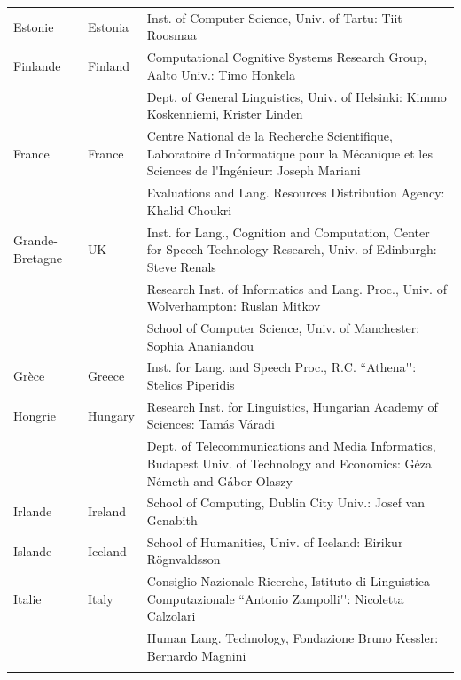 \begin{longtable}{llp{105mm}}
  Estonie & \textcolor{grey1}{Estonia} & Inst. of Computer Science, Univ. of Tartu: Tiit Roosmaa\\ \addlinespace

  Finlande & \textcolor{grey1}{Finland} & Computational Cognitive Systems Research Group, Aalto Univ.: Timo Honkela\\ \addlinespace
  & & Dept. of General Linguistics, Univ. of Helsinki: Kimmo Koskenniemi, Krister Linden \\ \addlinespace
 
 France & \textcolor{grey1}{France} & Centre National de la Recherche Scientifique, Laboratoire d{\mbox '}Informatique pour la Mécanique et les Sciences de l{\mbox '}Ingénieur: Joseph Mariani \\ \addlinespace
  & & Evaluations and Lang. Resources Distribution Agency: Khalid Choukri\\ \addlinespace 

  Grande-Bretagne & \textcolor{grey1}{UK} & Inst. for Lang., Cognition and Computation, Center for Speech Technology Research, Univ. of Edinburgh: Steve Renals \\ \addlinespace 
  & & Research Inst. of Informatics and Lang. Proc., Univ. of Wolverhampton: Ruslan Mitkov \\ \addlinespace 
  & & School of Computer Science, Univ. of Manchester: Sophia Ananiandou \\ \addlinespace 

  Grèce & \textcolor{grey1}{Greece} & Inst. for Lang. and Speech Proc., R.C. ``Athena{\mbox '}{\mbox '}: Stelios Piperidis\\ \addlinespace

  Hongrie & \textcolor{grey1}{Hungary} & Research Inst. for Linguistics, Hungarian Academy of Sciences: Tamás Váradi\\  \addlinespace
  & & Dept. of Telecommunications and Media Informatics, Budapest Univ. of Technology and Economics: Géza Németh and Gábor Olaszy\\ \addlinespace

  Irlande & \textcolor{grey1}{Ireland} & School of Computing, Dublin City Univ.: Josef van Genabith\\ \addlinespace

  Islande & \textcolor{grey1}{Iceland} & School of Humanities, Univ. of Iceland: Eirikur Rögnvaldsson\\ \addlinespace

  Italie & \textcolor{grey1}{Italy} & Consiglio Nazionale Ricerche, Istituto di Linguistica Computazionale ``Antonio Zampolli{\mbox '}{\mbox '}: Nicoletta Calzolari\\ \addlinespace
  & & Human Lang. Technology, Fondazione Bruno Kessler: Bernardo Magnini\\ \addlinespace 


\end{longtable}
